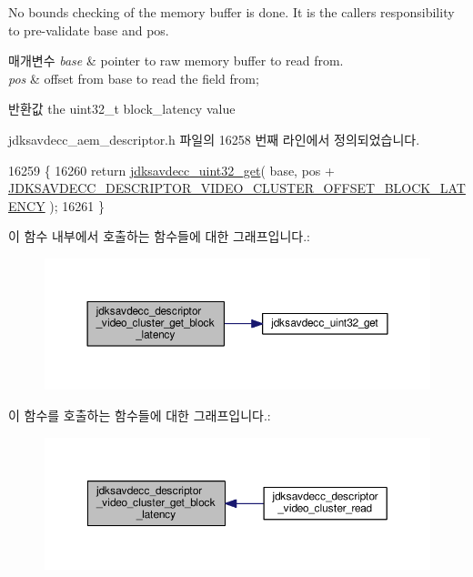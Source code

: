 No bounds checking of the memory buffer is done. It is the caller\textquotesingle{}s responsibility to pre-\/validate base and pos.


\begin{DoxyParams}{매개변수}
{\em base} & pointer to raw memory buffer to read from. \\
\hline
{\em pos} & offset from base to read the field from; \\
\hline
\end{DoxyParams}
\begin{DoxyReturn}{반환값}
the uint32\+\_\+t block\+\_\+latency value 
\end{DoxyReturn}


jdksavdecc\+\_\+aem\+\_\+descriptor.\+h 파일의 16258 번째 라인에서 정의되었습니다.


\begin{DoxyCode}
16259 \{
16260     \textcolor{keywordflow}{return} \hyperlink{group__endian_gaefcf5bd4f368997a82f358ab89052d6b}{jdksavdecc\_uint32\_get}( base, pos + 
      \hyperlink{group__descriptor__video__cluster_gaf9c0cc92b56856d260479239856ecd50}{JDKSAVDECC\_DESCRIPTOR\_VIDEO\_CLUSTER\_OFFSET\_BLOCK\_LATENCY}
       );
16261 \}
\end{DoxyCode}


이 함수 내부에서 호출하는 함수들에 대한 그래프입니다.\+:
\nopagebreak
\begin{figure}[H]
\begin{center}
\leavevmode
\includegraphics[width=350pt]{group__descriptor__video__cluster_ga6dc5ad183a8c8e0d52c7f656bfdef4a3_cgraph}
\end{center}
\end{figure}




이 함수를 호출하는 함수들에 대한 그래프입니다.\+:
\nopagebreak
\begin{figure}[H]
\begin{center}
\leavevmode
\includegraphics[width=350pt]{group__descriptor__video__cluster_ga6dc5ad183a8c8e0d52c7f656bfdef4a3_icgraph}
\end{center}
\end{figure}


